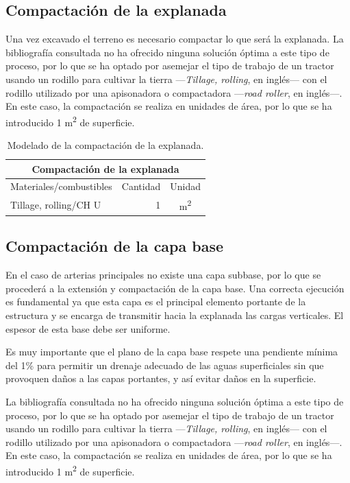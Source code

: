 \subsection{Compactación de la explanada}

Una vez excavado el terreno es necesario compactar lo que será la explanada. La bibliografía consultada no ha ofrecido ninguna solución óptima a este tipo de proceso, por lo que se ha optado por asemejar el tipo de trabajo de un tractor usando un rodillo para cultivar la tierra —\textit{Tillage, rolling}, en inglés— con el rodillo utilizado por una apisonadora o compactadora —\textit{road roller}, en inglés—. En este caso, la compactación se realiza en unidades de área, por lo que se ha introducido 1 \si{m^2} de superficie.

\begin{table}[!htb]
\centering
\begin{tabular}{p{8cm}rc}
\toprule
\multicolumn{3}{c}{Compactación de la explanada}\\
\midrule
Materiales/combustibles & Cantidad & Unidad\\
\midrule
Tillage, rolling/CH U & 1 & \si{m^2}\\
\bottomrule
\end{tabular}
\caption{Modelado de la compactación de la explanada.}
\label{modeladoexplanada}
\end{table}

\subsection{Compactación de la capa base}

En el caso de arterias principales no existe una capa subbase, por lo que se procederá a la extensión y compactación de la capa base. Una correcta ejecución es fundamental ya que esta capa es el principal elemento portante de la estructura y se encarga de transmitir hacia la explanada las cargas verticales. El espesor de esta base debe ser uniforme.

Es muy importante que el plano de la capa base respete una pendiente mínima del 1\% para permitir un drenaje adecuado de las aguas superficiales sin que provoquen daños a las capas portantes, y así evitar daños en la superficie.

La bibliografía consultada no ha ofrecido ninguna solución óptima a este tipo de proceso, por lo que se ha optado por asemejar el tipo de trabajo de un tractor usando un rodillo para cultivar la tierra —\textit{Tillage, rolling}, en inglés— con el rodillo utilizado por una apisonadora o compactadora —\textit{road roller}, en inglés—. En este caso, la compactación se realiza en unidades de área, por lo que se ha introducido 1 \si{m^2} de superficie.


